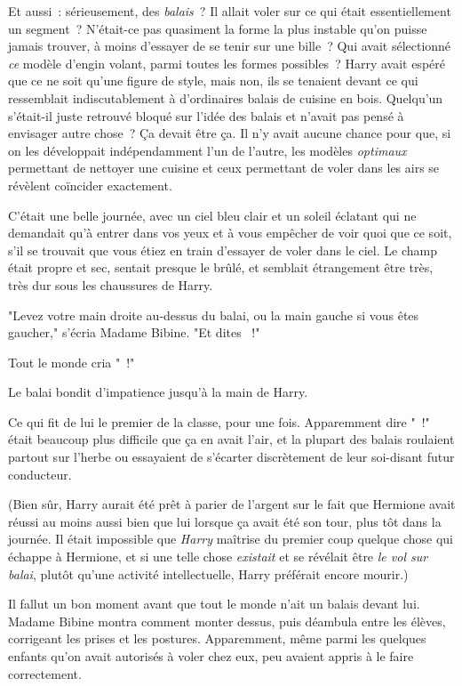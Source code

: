 Et aussi~: sérieusement, des \emph{balais}~? Il allait voler sur ce qui était essentiellement un segment~? N'était-ce pas quasiment la forme la plus instable qu'on puisse jamais trouver, à moins d'essayer de se tenir sur une bille~? Qui avait sélectionné \emph{ce} modèle d'engin volant, parmi toutes les formes possibles~? Harry avait espéré que ce ne soit qu'une figure de style, mais non, ils se tenaient devant ce qui ressemblait indiscutablement à d'ordinaires balais de cuisine en bois. Quelqu'un s'était-il juste retrouvé bloqué sur l'idée des balais et n'avait pas pensé à envisager autre chose~? Ça devait être ça. Il n'y avait aucune chance pour que, si on les développait indépendamment l'un de l'autre, les modèles \emph{optimaux} permettant de nettoyer une cuisine et ceux permettant de voler dans les airs se révèlent coïncider exactement.

C'était une belle journée, avec un ciel bleu clair et un soleil éclatant qui ne demandait qu'à entrer dans vos yeux et à vous empêcher de voir quoi que ce soit, s'il se trouvait que vous étiez en train d'essayer de voler dans le ciel. Le champ était propre et sec, sentait presque le brûlé, et semblait étrangement être très, très dur sous les chaussures de Harry.

"Levez votre main droite au-dessus du balai, ou la main gauche si vous êtes gaucher," s'écria Madame Bibine. "Et dites ~!"

Tout le monde cria "~!"

Le balai bondit d'impatience jusqu'à la main de Harry.

Ce qui fit de lui le premier de la classe, pour une fois. Apparemment dire "~!" était beaucoup plus difficile que ça en avait l'air, et la plupart des balais roulaient partout sur l'herbe ou essayaient de s'écarter discrètement de leur soi-disant futur conducteur.

(Bien sûr, Harry aurait été prêt à parier de l'argent sur le fait que Hermione avait réussi au moins aussi bien que lui lorsque ça avait été son tour, plus tôt dans la journée. Il était impossible que \emph{Harry} maîtrise du premier coup quelque chose qui échappe à Hermione, et si une telle chose \emph{existait} et se révélait être \emph{le vol sur balai}, plutôt qu'une activité intellectuelle, Harry préférait encore mourir.)

Il fallut un bon moment avant que tout le monde n'ait un balais devant lui. Madame Bibine montra comment monter dessus, puis déambula entre les élèves, corrigeant les prises et les postures. Apparemment, même parmi les quelques enfants qu'on avait autorisés à voler chez eux, peu avaient appris à le faire correctement.

